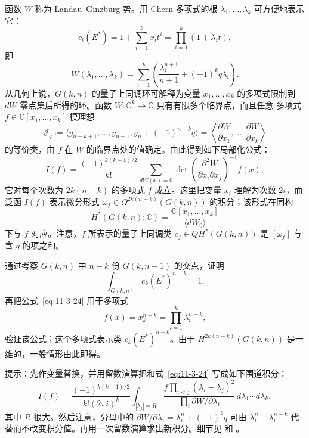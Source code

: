 函数 $W$ 称为 Landau--Ginzburg 势。用 Chern 多项式的根
$\lambda_1,\ldots,\lambda_k$ 可方便地表示它：
\begin{equation}\label{eq:11-3-22}
  c_t(E^*)=1+\sum_{i=1}^kx_it^i
  =\prod_{i=1}^k(1+\lambda_it),
\end{equation}
即
\begin{equation}\label{eq:11-3-23}
  W(\lambda_1,\ldots,\lambda_k)
  =\sum_{i=1}^k\left(\frac{\lambda_i^{n+1}}{n+1}
  +(-1)^kq\lambda_i\right).
\end{equation}
从几何上说，$G(k,n)$ 的量子上同调环可解释为变量 $x_1,\ldots,x_k$ 的多项式限制到
$dW$ 零点集后所得的环。函数 $W:\mathbb C^k\to\mathbb C$ 只有有限多个临界点，而且任意
多项式 $f\in\mathbb C[x_1,\ldots,x_k]$ 模理想
\[
  \mathcal J_q:=
  \langle y_{n-k+1},\ldots,y_{n-1},y_n+(-1)^{n-k}q\rangle
  =\left\langle\frac{\partial W}{\partial x_1},\ldots,
  \frac{\partial W}{\partial x_k}\right\rangle
\]
的等价类，由 $f$ 在 $W$ 的临界点处的值确定。由此得到如下局部化公式：
\begin{equation}\label{eq:11-3-24}
  I(f)=\frac{(-1)^{k(k-1)/2}}{k!}
  \sum_{dW(x)=0}
  \det\left(\frac{\partial^2W}{\partial x_i\partial x_j}\right)^{-1}f(x),
\end{equation}
它对每个次数为 $2k(n-k)$ 的多项式 $f$ 成立。这里把变量 $x_i$ 理解为次数 $2i$，而
泛函 $I(f)$ 表示微分形式
$\omega_f\in\Omega^{2k(n-k)}(G(k,n))$ 的积分；该形式在同构
\[
  H^*(G(k,n);\mathbb C)
  =\frac{\mathbb C[x_1,\ldots,x_k]}{\langle dW_0\rangle}
\]
下与 $f$ 对应。注意，$f$ 所表示的量子上同调类
$c_f\in QH^*(G(k,n))$ 是 $[\omega_f]$ 与含 $q$ 的项之和。

\begin{exercise}\label{ex:11-3-15}
通过考察 $G(k,n)$ 中 $n-k$ 份 $G(k,n-1)$ 的交点，证明
\[
  \int_{G(k,n)}c_k(E^*)^{n-k}=1.
\]
再把公式~\eqref{eq:11-3-24} 用于多项式
\[
  f(x)=x_k^{n-k}=\prod_{i=1}^k\lambda_i^{n-k},
\]
验证该公式；这个多项式表示类 $c_k(E^*)^{n-k}$。由于
$H^{2k(n-k)}(G(k,n))$ 是一维的，一般情形由此即得。

提示：先作变量替换，并用留数演算把和式~\eqref{eq:11-3-24} 写成如下围道积分：
\[
  I(f)=\frac{(-1)^{k(k-1)/2}}{k!(2\pi i)^k}
  \int_{|\lambda_j|=R}
  \frac{f\prod_{i<j}(\lambda_i-\lambda_j)^2}
  {\prod_i\partial W/\partial\lambda_i}
  \,d\lambda_1\cdots d\lambda_k,
\]
其中 $R$ 很大。然后注意，分母中的
$\partial W/\partial\lambda_i=\lambda_i^n+(-1)^kq$ 可由
$\lambda_i^n-\lambda_i^{n-k}$ 代替而不改变积分值。再用一次留数演算求出新积分。细节见
 和 。
\end{exercise}

